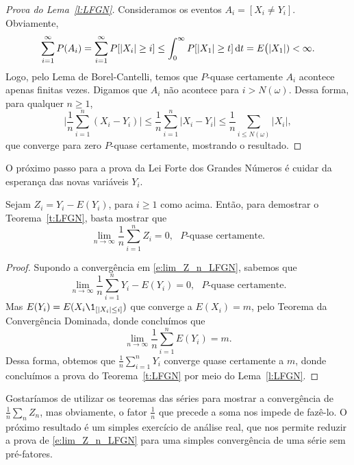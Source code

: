\begin{topics}
\begin{proof}[Prova do Lema~\ref{l:LFGN}]
  Consideramos os eventos $A_i = [X_i \neq Y_i]$.
  Obviamente,
  \begin{equation}
  \sum_{i=1}^{\infty} P(A_i) = \sum_{i=1}^{\infty} P[|X_i| \geq i] \leq 
  \int_0^\infty P[|X_1| \geq t] \mathop{}\!\mathrm{d} t = E\big(|X_1|) < \infty.
  \end{equation}
  Logo, pelo Lema de Borel-Cantelli, temos que $P$-quase certamente $A_i$ acontece apenas finitas vezes.
  Digamos que $A_i$ não acontece para $i > N(\omega)$.
  Dessa forma, para qualquer $n \geq 1$,
  \begin{equation}
    \Big|\frac{1}{n}\sum_{i=1}^n (X_i - Y_i)\Big| \leq \frac{1}{n}\sum_{i=1}^n |X_i - Y_i| \leq \frac{1}{n} \sum_{i \leq N(\omega)} |X_i|,
  \end{equation}
  que converge para zero $P$-quase certamente, mostrando o resultado.
\end{proof}

O próximo passo para a prova da Lei Forte dos Grandes Números é cuidar da esperança das novas variáveis $Y_i$.
\begin{lemma}
  \label{l:lim_Z_n_LFGN}
  Sejam $Z_i = Y_i - E(Y_i)$, para $i \geq 1$ como acima.
  Então, para demostrar o Teorema~\ref{t:LFGN}, basta mostrar que
  \begin{equation}
    \label{e:lim_Z_n_LFGN}
    \lim_{n \to \infty}\frac{1}{n} \sum_{i=1}^n Z_i = 0, \text{ $P$-quase certamente.}
  \end{equation}
\end{lemma}

\begin{proof}
  Supondo a convergência em \eqref{e:lim_Z_n_LFGN}, sabemos que
  \begin{equation}
    \lim_{n \to \infty} \frac{1}{n} \sum_{i=1}^n Y_i - E(Y_i) = 0, \text{ $P$-quase certamente.}
  \end{equation}
  Mas $E(Y_i) = E(X_i \1_{[|X_i| \leq i]})$ que converge a $E(X_i) = m$, pelo Teorema da Convergência Dominada, donde concluímos que
  \begin{equation}
    \lim_{n \to \infty} \frac{1}{n} \sum_{i=1}^n E(Y_i) = m.
  \end{equation}
  Dessa forma, obtemos que $\tfrac 1n \sum_{i=1}^n Y_i$ converge quase certamente a $m$, donde concluímos a prova do Teorema~\ref{t:LFGN} por meio do Lema~\ref{l:LFGN}.
\end{proof}

Gostaríamos de utilizar os teoremas das séries para mostrar a convergência de $\tfrac 1n \sum_{n} Z_n$, mas obviamente, o fator $\tfrac 1n$ que precede a soma nos impede de fazê-lo.
O próximo resultado é um simples exercício de análise real, que nos permite reduzir a prova de \eqref{e:lim_Z_n_LFGN} para uma simples convergência de uma série sem pré-fatores.


\end{topics}
